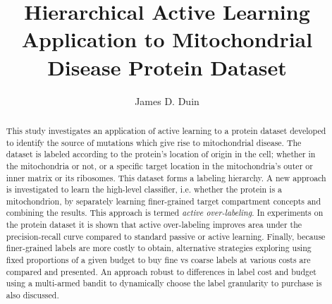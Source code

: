 \documentclass[ms]{nuthesis}
\begin{document}
\frontmatter

\title{Hierarchical Active Learning Application to Mitochondrial Disease Protein Dataset}
\author{James D. Duin}
\maketitle
\begin{abstract}
This study investigates an application of active learning to
a protein dataset developed to identify the source of mutations
which give rise to mitochondrial disease.
The dataset is labeled according to the protein's location of origin
in the cell; whether in the mitochondria or not, or a specific target
location in the
mitochondria's outer or inner matrix or its ribosomes. This dataset
 forms a labeling hierarchy.
 A new approach is investigated to learn the high-level classifier, i.e.
 whether the protein is a mitochondrion, by separately learning
 finer-grained target compartment concepts and combining the results. This
 approach is termed \textit{active over-labeling}.
 In experiments on the protein dataset it is shown that
 active over-labeling improves area under the precision-recall curve
 compared to standard passive or active learning.
 Finally, because finer-grained labels are more costly to obtain, alternative
 strategies exploring using fixed proportions of a given budget to buy
  fine vs coarse labels at various costs are compared and presented.
  An approach robust to differences in label cost and budget using
  a multi-armed bandit to dynamically choose the label granularity to purchase
  is also discussed.
\end{abstract}

\end{document}
